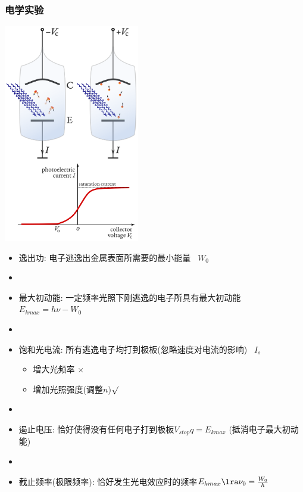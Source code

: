 \documentclass{article}
\begin{document}
\subsubsection{电学实验}
\begin{minipage}{0.45 \textwidth}
    \includegraphics[width=16em,keepaspectratio]{./pictures/11.png}
\end{minipage}
\hspace{-2em}
\begin{minipage}{0.5\textwidth}
    \begin{itemize}
        \item 逸出功: 电子逃逸出金属表面所需要的最小能量 \, $W_{0}$
        \item[]
        \item 最大初动能: 一定频率光照下刚逃逸的电子所具有最大初动能 $E_{kmax} = h\nu - W_{0}$
        \item[]
        \item 饱和光电流: 所有逃逸电子均打到极板(忽略速度对电流的影响) \, $I_{s}$
              \begin{itemize}
                  \item[] 增大光频率 $\times$
                  \item[] 增加光照强度(调整$n$)$\surd$
              \end{itemize}
        \item[]
        \item 遏止电压: 恰好使得没有任何电子打到极板$V_{stop}q = E_{kmax}$ (抵消电子最大初动能)
        \item[]
        \item 截止频率(极限频率): 恰好发生光电效应时的频率$E_{kmax} \lra \nu_{0} = \frac{W_{0}}{h} $
    \end{itemize}
\end{minipage}
\end{document}

